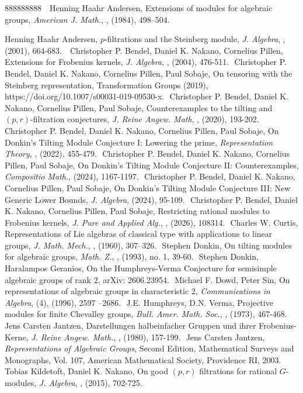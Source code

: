 \documentclass[twoside,11pt,reqno]{amsart}
\newcommand{\0}{\bar 0}
\newcommand{\1}{\bar 1}
\theoremstyle{definition}
\numberwithin{equation}{subsection}
\begin{document}
\begin{thebibliography}{888888888}
﻿
﻿
 Henning Haahr Andersen, {Extensions of modules for algebraic groups}, {\em American J. Math.}, {}, (1984), 498--504.

 Henning Haahr Andersen, $p$-filtrations and the Steinberg module, {\em J. Algebra}, {}, (2001), 664-683. ﻿
﻿
 Christopher P. Bendel, Daniel K. Nakano, Cornelius Pillen, Extensions for Frobenius kernels, {\em J. Algebra}, {}, (2004), 476-511.
﻿
 Christopher P. Bendel, Daniel K. Nakano, Cornelius Pillen, Paul Sobaje, On tensoring with the Steinberg representation, Transformation Groups (2019), https://doi.org/10.1007/s00031-019-09530-x.
﻿
 Christopher P. Bendel, Daniel K. Nakano, Cornelius Pillen, Paul Sobaje, Counterexamples to the tilting and $(p,r)$-filtration conjectures, {\em J. Reine Angew. Math}, {}, (2020), 193-202. 
﻿
 Christopher P. Bendel, Daniel K. Nakano, Cornelius Pillen, Paul Sobaje, On Donkin's Tilting Module Conjecture I: Lowering the prime,
{\em Representation Theory}, {}, (2022), 455-479. 
﻿
 Christopher P. Bendel, Daniel K. Nakano, Cornelius Pillen, Paul Sobaje, On Donkin's Tilting Module Conjecture II: Counterexamples, {\em Compositio Math.}, {} (2024), 1167-1197. 
﻿
 Christopher P. Bendel, Daniel K. Nakano, Cornelius Pillen, Paul Sobaje, On Donkin's Tilting Module Conjecture III: New Generic Lower Bounds, {\em J. Algebra}, {} (2024), 95-109. 
﻿
 Christopher P. Bendel, Daniel K. Nakano, Cornelius Pillen, Paul Sobaje, Restricting rational modules to Frobenius kernels, {\em J. Pure and Applied Alg.}, {}, (2026), 108314.
﻿
 Charles W. Curtis, Representations of Lie algebras of classical type with applications to linear groups, {\em J. Math. Mech.}, {}, (1960), 307--326. 
﻿
 Stephen Donkin, On tilting modules for algebraic groups, {\em Math. Z.}, {}, (1993), no. 1, 39-60.
﻿
 Stephen Donkin, Haralampos Geranios, On the Humphreys-Verma Conjecture for semisimple algebraic groups of rank $2$, arXiv: 2606.23954. 
﻿
 Michael F. Dowd, Peter Sin, On representations of algebraic groups in characteristic $2$, {\em Communications in Algebra}, 
{(4)}, (1996), 2597 --2686. 
﻿
 J.E. Humphreys, D.N. Verma, Projective modules for finite Chevalley groups, {\em Bull. Amer. Math. Soc.}, {}, (1973), 467-468.
﻿
 Jens Carsten Jantzen, Darstellungen halbeinfacher Gruppen und ihrer Frobenius-Kerne, {\em J. Reine Angew. Math.}, {}, (1980), 157-199.
﻿
 Jens Carsten Jantzen, {\em Representations of
Algebraic Groups}, Second Edition, Mathematical Surveys and Monographs, Vol. 107, American Mathematical Society, Providence RI, 2003. 
﻿
 Tobias Kildetoft, Daniel K. Nakano, On good $(p,r)$ filtrations for rational $G$-modules,  {\em J. Algebra}, {}, (2015), 702-725. 


\end{thebibliography}
\end{document}
